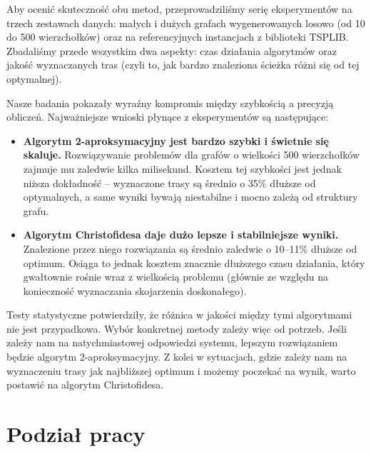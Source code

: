\documentclass{article}
\theoremstyle{definition}
\theoremstyle{plain}
\theoremstyle{remark}
\begin{document}
Aby ocenić skuteczność obu metod, przeprowadziliśmy serię eksperymentów na trzech zestawach danych: małych i dużych grafach wygenerowanych losowo (od 10 do 500 wierzchołków) oraz na referencyjnych instancjach z biblioteki TSPLIB. Zbadaliśmy przede wszystkim dwa aspekty: czas działania algorytmów oraz jakość wyznaczanych tras (czyli to, jak bardzo znaleziona ścieżka różni się od tej optymalnej).

Nasze badania pokazały wyraźny kompromis między szybkością a precyzją obliczeń. Najważniejsze wnioski płynące z eksperymentów są następujące:
\begin{itemize}
    \item \textbf{Algorytm 2-aproksymacyjny jest bardzo szybki i świetnie się skaluje.} Rozwiązywanie problemów dla grafów o wielkości 500 wierzchołków zajmuje mu zaledwie kilka milisekund. Kosztem tej szybkości jest jednak niższa dokładność -- wyznaczone trasy są średnio o 35\% dłuższe od optymalnych, a same wyniki bywają niestabilne i mocno zależą od struktury grafu.
    \item \textbf{Algorytm Christofidesa daje dużo lepsze i stabilniejsze wyniki.} Znalezione przez niego rozwiązania są średnio zaledwie o 10--11\% dłuższe od optimum. Osiąga to jednak kosztem znacznie dłuższego czasu działania, który gwałtownie rośnie wraz z wielkością problemu (głównie ze względu na konieczność wyznaczania skojarzenia doskonałego).
\end{itemize}

\noindent
Testy statystyczne potwierdziły, że różnica w jakości między tymi algorytmami nie jest przypadkowa. Wybór konkretnej metody zależy więc od potrzeb. Jeśli zależy nam na natychmiastowej odpowiedzi systemu, lepszym rozwiązaniem będzie algorytm 2-aproksymacyjny. Z kolei w sytuacjach, gdzie zależy nam na wyznaczeniu trasy jak najbliższej optimum i możemy poczekać na wynik, warto postawić na algorytm Christofidesa.

\newpage
\section{Podział pracy}
\end{document}
